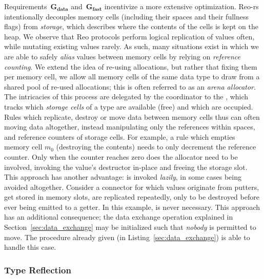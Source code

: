 Requirements~$\boldsymbol{G_{data}}$ and~$\boldsymbol{G_{fast}}$ incentivize a more extensive optimization. Reo-rs intentionally decouples memory cells (including their spaces and their fullness flags) from \textit{storage}, which describes where the contents of the cells is kept on the heap. We observe that Reo protocols perform logical replication of values often, while mutating existing values rarely. As such, many situations exist in which we are able to safely \textit{alias} values between memory cells by relying on \textit{reference counting}. We extend the idea of re-using allocations, but rather that fixing them per memory cell, we allow all memory cells of the same data type to draw from a shared pool of re-used allocations; this is often referred to as an \textit{arena allocator}. The intricacies of this process are delegated by the coordinator to the , which tracks which \textit{storage cells} of a type are available (free) and which are occupied. Rules which replicate, destroy or move data between memory cells thus can often moving data altogether, instead manipulating only the references within spaces, and reference counters of storage cells. For example, a rule which empties memory cell $m_0$ (destroying the contents) needs to only decrement the reference counter. Only when the counter reaches zero does the allocator need to be involved, invoking the value's destructor in-place and freeing the storage slot. This approach has another advantage:  is invoked \textit{lazily}, in some cases being avoided altogether. Consider a connector for which values originate from putters, get stored in memory slots, are replicated repeatedly, only to be destroyed before ever being emitted to a getter. In this example,  is never necessary. This approach has an additional consequence; the data exchange operation explained in Section~\ref{sec:data_exchange} may be initialized such that \textit{nobody} is permitted to move. The procedure already given (in Listing~\ref{sec:data_exchange}) is able to handle this case.

\subsubsection{Type Reflection}
\label{sec:type_reflection}

